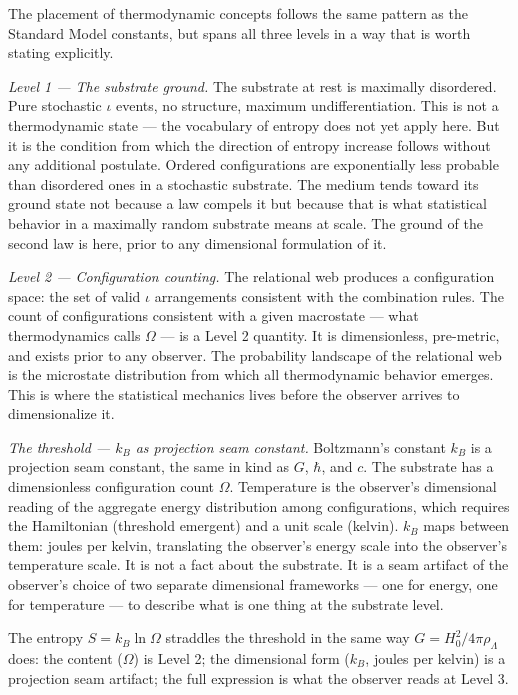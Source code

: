 \documentclass[11pt,letterpaper]{article}
\begin{document}
The placement of thermodynamic concepts follows the same pattern as the Standard Model constants, but spans all three levels in a way that is worth stating explicitly.

\emph{Level 1 --- The substrate ground.} The substrate at rest is maximally disordered. Pure stochastic \(\iota\) events, no structure, maximum undifferentiation. This is not a thermodynamic state --- the vocabulary of entropy does not yet apply here. But it is the condition from which the direction of entropy increase follows without any additional postulate. Ordered configurations are exponentially less probable than disordered ones in a stochastic substrate. The medium tends toward its ground state not because a law compels it but because that is what statistical behavior in a maximally random substrate means at scale. The ground of the second law is here, prior to any dimensional formulation of it.

\emph{Level 2 --- Configuration counting.} The relational web produces a configuration space: the set of valid \(\iota\) arrangements consistent with the combination rules. The count of configurations consistent with a given macrostate --- what thermodynamics calls \(\Omega\) --- is a Level 2 quantity. It is dimensionless, pre-metric, and exists prior to any observer. The probability landscape of the relational web is the microstate distribution from which all thermodynamic behavior emerges. This is where the statistical mechanics lives before the observer arrives to dimensionalize it.

\emph{The threshold --- \(k_B\) as projection seam constant.} Boltzmann's constant \(k_B\) is a projection seam constant, the same in kind as \(G\), \(\hbar\), and \(c\). The substrate has a dimensionless configuration count \(\Omega\). Temperature is the observer's dimensional reading of the aggregate energy distribution among configurations, which requires the Hamiltonian (threshold emergent) and a unit scale (kelvin). \(k_B\) maps between them: joules per kelvin, translating the observer's energy scale into the observer's temperature scale. It is not a fact about the substrate. It is a seam artifact of the observer's choice of two separate dimensional frameworks --- one for energy, one for temperature --- to describe what is one thing at the substrate level.

The entropy \(S = k_B \ln\Omega\) straddles the threshold in the same way \(G = H_0^2 / 4\pi\rho_\Lambda\) does: the content (\(\Omega\)) is Level 2; the dimensional form (\(k_B\), joules per kelvin) is a projection seam artifact; the full expression is what the observer reads at Level 3.
\end{document}

